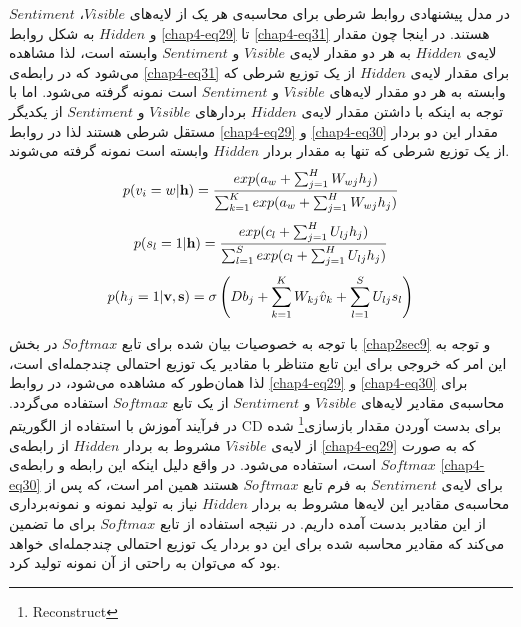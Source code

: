 در مدل پیشنهادی روابط شرطی برای محاسبه‌ی هر یک از لایه‌های
$Visible$، $Sentiment$
و
$Hidden$
 به شکل روابط
\ref{chap4-eq29}
تا
\ref{chap4-eq31}
هستند. در اینجا چون مقدار لایه‌ی
$Hidden$
به هر دو مقدار لایه‌ی
$Visible$
و
$Sentiment$
وابسته است، لذا مشاهده می‌‌شود که در رابطه‌ی
\ref{chap4-eq31}
برای مقدار لایه‌ی
$Hidden$
از یک توزیع شرطی که وابسته به هر دو مقدار لایه‌های
$Visible$
و
$Sentiment$
است نمونه گرفته می‌‌شود. اما با توجه به اینکه با داشتن مقدار لایه‌ی
$Hidden$
بردارهای
$Visible$
و
$Sentiment$
از یکدیگر مستقل شرطی هستند لذا در روابط
\ref{chap4-eq29}
و
\ref{chap4-eq30}
مقدار این دو بردار از یک توزیع شرطی که تنها به مقدار بردار
$Hidden$
وابسته است نمونه گرفته می‌‌شوند.
\begin{align}
	\centering
	\label{chap4-eq29}
	p(v_{i}=w|\textbf{h})=\dfrac{exp(a_{w}+\sum_{j=1}^{H}W_{wj}h_j)}{\sum_{k=1}^{K}exp(a_{w}+\sum_{j=1}^{H}W_{wj}h_j)}
\end{align}
\begin{align}
	\centering
	\label{chap4-eq30}
	p(s_{l}=1|\textbf{h})=\dfrac{exp(c_{l}+\sum_{j=1}^{H}U_{lj}h_j)}{\sum_{l=1}^{S}exp(c_{l}+\sum_{j=1}^{H}U_{lj}h_j)}
\end{align}
\begin{align}
	\centering
	\label{chap4-eq31}
	p(h_{j}=1|\textbf{v},\textbf{s})=\sigma \left( Db_j + \sum_{k=1}^{K}W_{kj}\hat{v}_k + \sum_{l=1}^{S}U_{lj}s_l \right)
\end{align}

با توجه به خصوصیات بیان شده برای تابع
$Softmax$
در بخش
\ref{chap2sec9}
و توجه به این امر که خروجی برای این تابع متناظر با مقادیر یک توزیع احتمالی‌ چندجمله‌ای است، لذا همان‌طور که مشاهده می‌‌شود، در روابط
\ref{chap4-eq29}
و
\ref{chap4-eq30}
برای محاسبه‌ی مقادیر لایه‌های
$Visible$
و
$Sentiment$
از یک تابع
$Softmax$
استفاده می‌‌گردد. در فرآیند آموزش با استفاده از الگوریتم
CD
برای بدست آوردن مقدار بازسازی\footnote{Reconstruct}
 شده از لایه‌ی
$Visible$
مشروط به بردار
$Hidden$
از رابطه‌ی
\ref{chap4-eq29}
که به صورت
$Softmax$
است، استفاده می‌‌شود. در واقع دلیل اینکه این رابطه و رابطه‌ی
\ref{chap4-eq30}
برای لایه‌ی
$Sentiment$
به فرم تابع
$Softmax$
هستند همین امر است، که پس از محاسبه‌ی مقادیر این لایه‌ها مشروط به بردار
$Hidden$
نیاز به تولید نمونه و نمونه‌برداری از این مقادیر بدست آمده داریم. در نتیجه استفاده از تابع
$Softmax$
برای ما تضمین می‌‌کند که مقادیر محاسبه شده برای این دو بردار یک توزیع احتمالی‌ چندجمله‌ای خواهد بود که می‌‌توان به راحتی‌ از آن نمونه تولید کرد.



%


